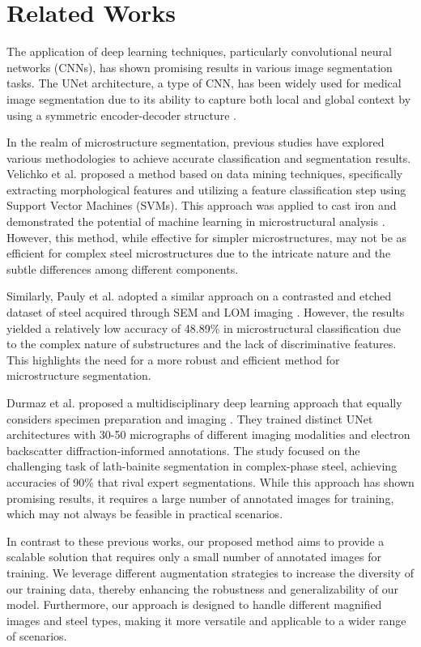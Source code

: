 \documentclass[]{article}
\begin{document}
\section{Related Works}

The application of deep learning techniques, particularly convolutional neural networks (CNNs), has shown promising results in various image segmentation tasks. The UNet architecture, a type of CNN, has been widely used for medical image segmentation due to its ability to capture both local and global context by using a symmetric encoder-decoder structure \cite{cao2021swinunet}.

In the realm of microstructure segmentation, previous studies have explored various methodologies to achieve accurate classification and segmentation results. Velichko et al. proposed a method based on data mining techniques, specifically extracting morphological features and utilizing a feature classification step using Support Vector Machines (SVMs). This approach was applied to cast iron and demonstrated the potential of machine learning in microstructural analysis \cite{sym13071176}. However, this method, while effective for simpler microstructures, may not be as efficient for complex steel microstructures due to the intricate nature and the subtle differences among different components.

Similarly, Pauly et al. adopted a similar approach on a contrasted and etched dataset of steel acquired through SEM and LOM imaging \cite{LAI2009665}. However, the results yielded a relatively low accuracy of 48.89\% in microstructural classification due to the complex nature of substructures and the lack of discriminative features. This highlights the need for a more robust and efficient method for microstructure segmentation.

Durmaz et al. proposed a multidisciplinary deep learning approach that equally considers specimen preparation and imaging \cite{Durmaz2021}. They trained distinct UNet architectures with 30-50 micrographs of different imaging modalities and electron backscatter diffraction-informed annotations. The study focused on the challenging task of lath-bainite segmentation in complex-phase steel, achieving accuracies of 90\% that rival expert segmentations. While this approach has shown promising results, it requires a large number of annotated images for training, which may not always be feasible in practical scenarios.

In contrast to these previous works, our proposed method aims to provide a scalable solution that requires only a small number of annotated images for training. We leverage different augmentation strategies to increase the diversity of our training data, thereby enhancing the robustness and generalizability of our model. Furthermore, our approach is designed to handle different magnified images and steel types, making it more versatile and applicable to a wider range of scenarios.
\end{document}
